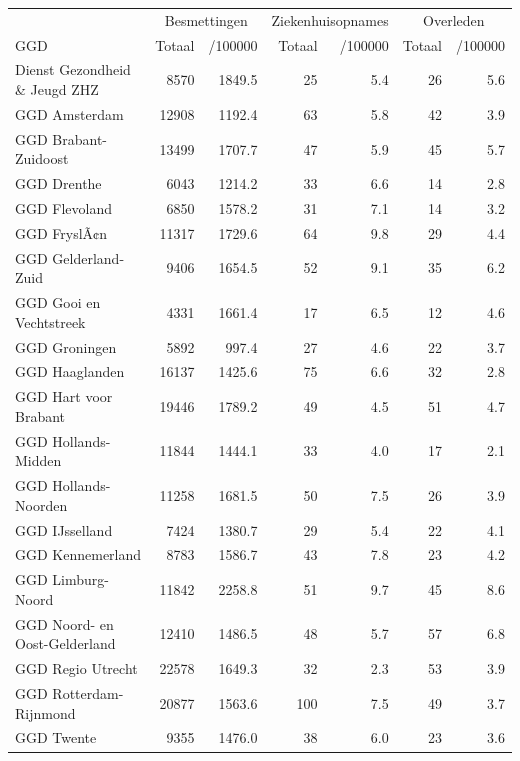 \documentclass[
  english,
  man,floatsintext]{apa6}
\begin{document}
\begin{table}
\centering\begingroup\fontsize{10}{12}\selectfont

\begin{threeparttable}
\begin{tabular}{lrrrrrr}
\toprule
\multicolumn{1}{c}{ } & \multicolumn{2}{c}{Besmettingen} & \multicolumn{2}{c}{Ziekenhuisopnames} & \multicolumn{2}{c}{Overleden} \\
\cmidrule(l{3pt}r{3pt}){2-3} \cmidrule(l{3pt}r{3pt}){4-5} \cmidrule(l{3pt}r{3pt}){6-7}
GGD & Totaal & /100000 & Totaal & /100000 & Totaal & /100000\\
\midrule
Dienst Gezondheid \& Jeugd ZHZ & 8570 & 1849.5 & 25 & 5.4 & 26 & 5.6\\
GGD Amsterdam & 12908 & 1192.4 & 63 & 5.8 & 42 & 3.9\\
GGD Brabant-Zuidoost & 13499 & 1707.7 & 47 & 5.9 & 45 & 5.7\\
GGD Drenthe & 6043 & 1214.2 & 33 & 6.6 & 14 & 2.8\\
GGD Flevoland & 6850 & 1578.2 & 31 & 7.1 & 14 & 3.2\\
GGD FryslÃ¢n & 11317 & 1729.6 & 64 & 9.8 & 29 & 4.4\\
GGD Gelderland-Zuid & 9406 & 1654.5 & 52 & 9.1 & 35 & 6.2\\
GGD Gooi en Vechtstreek & 4331 & 1661.4 & 17 & 6.5 & 12 & 4.6\\
GGD Groningen & 5892 & 997.4 & 27 & 4.6 & 22 & 3.7\\
GGD Haaglanden & 16137 & 1425.6 & 75 & 6.6 & 32 & 2.8\\
GGD Hart voor Brabant & 19446 & 1789.2 & 49 & 4.5 & 51 & 4.7\\
GGD Hollands-Midden & 11844 & 1444.1 & 33 & 4.0 & 17 & 2.1\\
GGD Hollands-Noorden & 11258 & 1681.5 & 50 & 7.5 & 26 & 3.9\\
GGD IJsselland & 7424 & 1380.7 & 29 & 5.4 & 22 & 4.1\\
GGD Kennemerland & 8783 & 1586.7 & 43 & 7.8 & 23 & 4.2\\
GGD Limburg-Noord & 11842 & 2258.8 & 51 & 9.7 & 45 & 8.6\\
GGD Noord- en Oost-Gelderland & 12410 & 1486.5 & 48 & 5.7 & 57 & 6.8\\
GGD Regio Utrecht & 22578 & 1649.3 & 32 & 2.3 & 53 & 3.9\\
GGD Rotterdam-Rijnmond & 20877 & 1563.6 & 100 & 7.5 & 49 & 3.7\\
GGD Twente & 9355 & 1476.0 & 38 & 6.0 & 23 & 3.6\\

\end{tabular}
\end{threeparttable}
\end{table}
\end{document}
